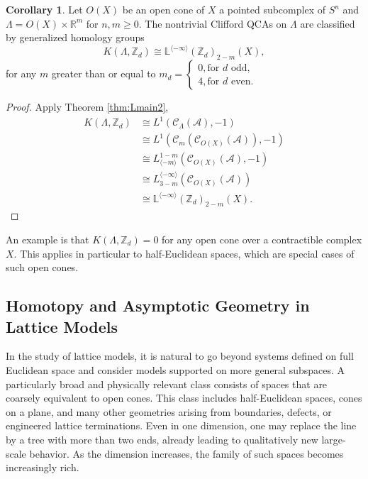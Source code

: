 \documentclass{article}
\theoremstyle{definition}
\newtheorem{cor}[theorem]{Corollary}
\newcommand{\CA}{{ \mathcal A}}
\newcommand{\ZZ}{{\mathbb Z}}
\newcommand{\RR}{{\mathbb R}}
\begin{document}
\begin{cor}
    Let $O(X)$ be an open cone of $X$ a pointed subcomplex of $S^n$ and $\Lambda=O(X)\times \RR^m$ for $n, m\geq 0$. The nontrivial Clifford QCAs on $\Lambda$ are classified by generalized homology groups 
    $$K(\Lambda, \ZZ_d)\cong  \mathbb L^{\langle -\infty \rangle}(\ZZ_d)_{2-m}(X),$$ for any $m$ greater than or equal to $m_d =\begin{cases}
        0, \text{for $d$ odd},\\
        4, \text{for $d$ even}.
    \end{cases}$ 
\end{cor}
\begin{proof}
Apply Theorem \ref{thm:Lmain2},
    \begin{align*}
        K(\Lambda, \ZZ_d)&\cong L^1(\mathcal C_\Lambda(\CA), -1)\\
        & \cong L^1(\mathcal C_m(\mathcal C_{O(X)}(\CA)), -1)\\
        &\cong L^{1-m}_{\langle -m \rangle}(\mathcal C_{O(X)}(\CA),-1)\\
        &\cong L_{3-m}^{\langle -\infty \rangle}(\mathcal C_{O(X)}(\CA))\\
        &\cong \mathbb L^{\langle -\infty \rangle}(\ZZ_d)_{2-m}(X).
    \end{align*}
\end{proof}
An example is that $K(\Lambda, \ZZ_d)=0$ for any open cone over a contractible complex $X$. This applies in particular to half-Euclidean spaces, which are special cases of such open cones.
\subsection{Homotopy and Asymptotic Geometry in Lattice Models}

In the study of lattice models, it is natural to go beyond systems defined on full Euclidean space and consider models supported on more general subspaces. A particularly broad and physically relevant class consists of spaces that are coarsely equivalent to open cones. This class includes half-Euclidean spaces, cones on a plane, and many other geometries arising from boundaries, defects, or engineered lattice terminations. Even in one dimension, one may replace the line by a tree with more than two ends, already leading to qualitatively new large-scale behavior. As the dimension increases, the family of such spaces becomes increasingly rich.
\end{document}
